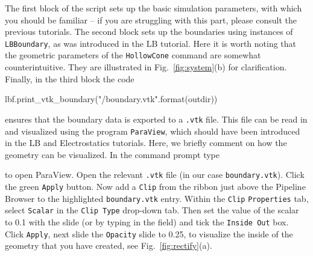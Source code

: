 \documentclass[aip,jcp,reprint,a4paper,onecolumn,amsmath]{revtex4-1}
\newcommand\code{\lstinline}
\newcommand\codees{\lstinline[language=python]}
\begin{document}
The first block of the script sets up the basic simulation parameters, with
which you should be familiar -- if you are struggling with this part, please
consult the previous tutorials. The second block sets up the boundaries using
instances of \codees{LBBoundary}, as was introduced in the LB tutorial. Here it
is worth noting that the geometric parameters of the \codees{HollowCone}
command are somewhat counterintuitive. They are illustrated in
Fig.~\ref{fig:system}(b) for clarification. Finally, in the third block the
code
\begin{espresso}
lbf.print_vtk_boundary("{}/boundary.vtk".format(outdir))
\end{espresso}
ensures that the boundary data is exported to a \codees{.vtk} file. This file
can be read in and visualized using the program \code{ParaView}, which should
have been introduced in the LB and Electrostatics tutorials. Here, we briefly
comment on how the geometry can be visualized. In the command prompt type
to open ParaView. Open the relevant \code{.vtk} file (in our case
\code{boundary.vtk}). Click the green \code{Apply} button. Now add a
\code{Clip} from the ribbon just above the Pipeline Browser to the highlighted
\code{boundary.vtk} entry. Within the \code{Clip} \code{Properties} tab, select
\code{Scalar} in the \code{Clip Type} drop-down tab. Then set the value of the
scalar to 0.1 with the slide (or by typing in the field) and tick the
\code{Inside Out} box. Click \code{Apply}, next slide the \code{Opacity} slide
to 0.25, to visualize the inside of the geometry that you have created, see
Fig.~\ref{fig:rectify}(a).
\end{document}
